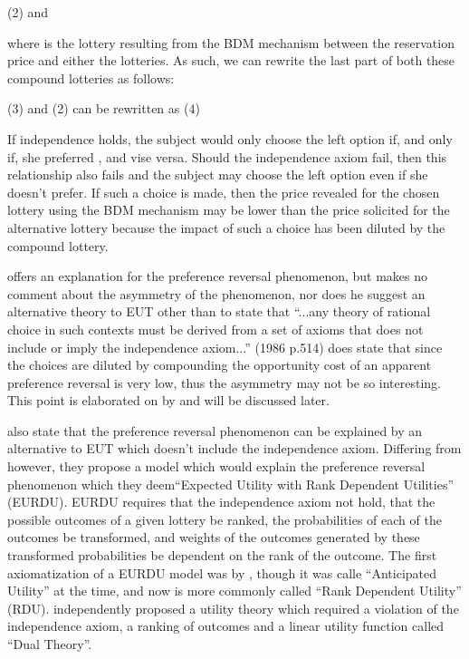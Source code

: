 (2)	  and   

where  is the lottery resulting from the BDM mechanism between the reservation price  and either the  lotteries.
As such, we can rewrite the last part of both these compound lotteries as follows:

(3)	
and (2) can be rewritten as
(4)	

If independence holds, the subject would only choose the left option if, and only if, she preferred , and vise versa.
Should the independence axiom fail, then this relationship also fails and the subject may choose the left option even if she doesn't prefer.
If such  a choice is made, then the price revealed for the chosen lottery using the BDM mechanism may be lower than the price solicited for the alternative lottery because the impact of such a choice has been diluted by the compound lottery. 

\textcite{Holt1986} offers an explanation for the preference reversal phenomenon, but makes no comment about the asymmetry of the phenomenon, nor does he suggest an alternative theory to EUT other than to state that \enquote{...any theory of rational choice in such contexts must be derived from a set of axioms that does not include or imply the independence axiom...} (1986 p.514) \textcite{Holt1986} does state that since the choices are diluted by compounding the opportunity cost of an apparent preference reversal is very low, thus the asymmetry may not be so interesting.
This point is elaborated on by \textcite{Harrison1989, Harrison1992} and will be discussed later. 

\textcite{Karni1987} also state that the preference reversal phenomenon can be explained by an alternative to EUT which doesn't include the independence axiom.
Differing from \textcite{Holt1986} however, they propose a model which would explain the preference reversal phenomenon which they deem\enquote{Expected Utility with Rank Dependent Utilities} (EURDU).
EURDU requires that  the independence axiom not hold, that the possible outcomes of a given lottery be ranked, the probabilities of each of the outcomes be transformed, and weights of the outcomes generated by these transformed probabilities be dependent on the rank of the outcome.
The first axiomatization of a EURDU model was by \textcite{Quiggin1982}, though it was calle \enquote{Anticipated Utility} at the time, and now is more commonly called \enquote{Rank Dependent Utility} (RDU).
\textcite{Yaari1987} independently proposed a utility theory which required a violation of the independence axiom, a ranking of outcomes and a linear utility function called \enquote{Dual Theory}.

